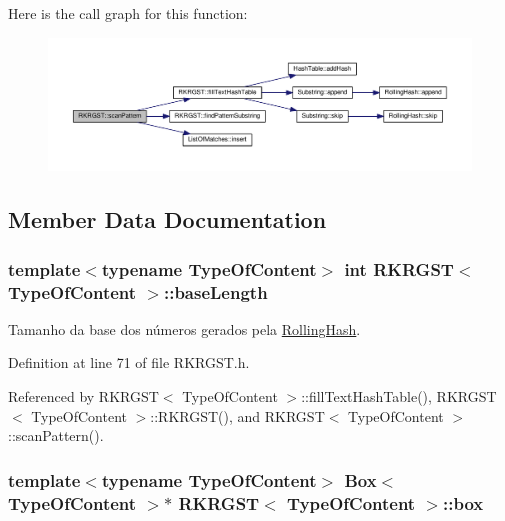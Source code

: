 Here is the call graph for this function\+:\nopagebreak
\begin{figure}[H]
\begin{center}
\leavevmode
\includegraphics[width=350pt]{classRKRGST_a4ef9cf20505986d0f023a5384fdf844c_cgraph}
\end{center}
\end{figure}




\subsection{Member Data Documentation}
\hypertarget{classRKRGST_a49054fd9d1f1fc34a5c2dedaba5e6f14}{
\subsubsection[{base\+Length}]{\setlength{\rightskip}{0pt plus 5cm}template$<$typename Type\+Of\+Content$>$ int {\bf R\+K\+R\+G\+S\+T}$<$ Type\+Of\+Content $>$\+::base\+Length}}\label{classRKRGST_a49054fd9d1f1fc34a5c2dedaba5e6f14}


Tamanho da base dos números gerados pela \hyperlink{classRollingHash}{Rolling\+Hash}. 



Definition at line 71 of file R\+K\+R\+G\+S\+T.\+h.



Referenced by R\+K\+R\+G\+S\+T$<$ Type\+Of\+Content $>$\+::fill\+Text\+Hash\+Table(), R\+K\+R\+G\+S\+T$<$ Type\+Of\+Content $>$\+::\+R\+K\+R\+G\+S\+T(), and R\+K\+R\+G\+S\+T$<$ Type\+Of\+Content $>$\+::scan\+Pattern().

\hypertarget{classRKRGST_ae0737f82fb5c44b9edd663a9ed00a7fe}{
\subsubsection[{box}]{\setlength{\rightskip}{0pt plus 5cm}template$<$typename Type\+Of\+Content$>$ {\bf Box}$<$ Type\+Of\+Content $>$$\ast$ {\bf R\+K\+R\+G\+S\+T}$<$ Type\+Of\+Content $>$\+::box}}\label{classRKRGST_ae0737f82fb5c44b9edd663a9ed00a7fe}


